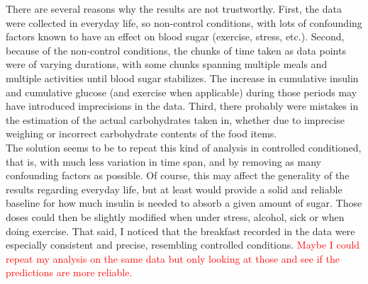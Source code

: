 There are several reasons why the results are not trustworthy.
First, the data were collected in everyday life, so non-control conditions, with lots of confounding factors known to have an effect on blood sugar (exercise, stress, etc.).
Second, because of the non-control conditions, the chunks of time taken as data points were of varying durations, with some chunks spanning multiple meals and multiple activities until blood sugar stabilizes.
The increase in cumulative insulin and cumulative glucose (and exercise when applicable) during those periods may have introduced imprecisions in the data.
Third, there probably were mistakes in the estimation of the actual carbohydrates taken in, whether due to imprecise weighing or incorrect carbohydrate contents of the food items.\\

The solution seems to be to repeat this kind of analysis in controlled conditioned, that is, with much less variation in time span, and by removing as many confounding factors as possible.
Of course, this may affect the generality of the results regarding everyday life, but at least would provide a solid and reliable baseline for how much insulin is needed to absorb a given amount of sugar.
Those doses could then be slightly modified when under stress, alcohol, sick or when doing exercise.
That said, I noticed that the breakfast recorded in the data were especially consistent and precise, resembling controlled conditions.
\textcolor{red}{Maybe I could repeat my analysis on the same data but only looking at those and see if the predictions are more reliable.}
